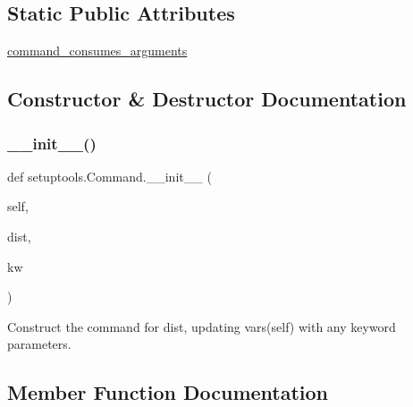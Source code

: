 \subsection*{Static Public Attributes}
\begin{DoxyCompactItemize}
\item 
\hyperlink{classsetuptools_1_1Command_a3be918b6c67e9e1b1a9679781044adbc}{command\+\_\+consumes\+\_\+arguments}
\end{DoxyCompactItemize}


\subsection{Constructor \& Destructor Documentation}
\mbox{\label{classsetuptools_1_1Command_a14ec5a9290a2b78f0ffe85b0144374b0}} 
\subsubsection{\texorpdfstring{\+\_\+\+\_\+init\+\_\+\+\_\+()}{\_\_init\_\_()}}
{\footnotesize\ttfamily def setuptools.\+Command.\+\_\+\+\_\+init\+\_\+\+\_\+ (\begin{DoxyParamCaption}\item[{}]{self,  }\item[{}]{dist,  }\item[{}]{kw }\end{DoxyParamCaption})}

\begin{DoxyVerb}Construct the command for dist, updating
vars(self) with any keyword parameters.
\end{DoxyVerb}
 

\subsection{Member Function Documentation}
\mbox{\label{classsetuptools_1_1Command_a34d329e0f917cf37d44c281ece76e54f}} 
